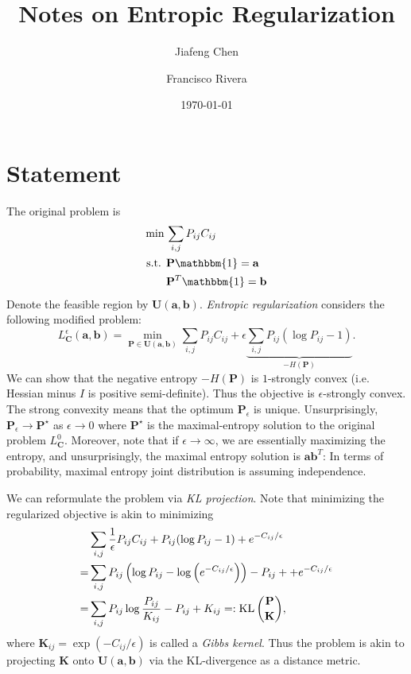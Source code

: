 \documentclass[11pt,reqno]{amsart}
\title{Notes on Entropic Regularization}
\author{Jiafeng Chen\and Francisco Rivera}
\date{\today}
\renewcommand{\b}{\mathbf}
\newcommand{\one}{\mathbbm{1}}
\newcommand{\KL}{\operatorname{KL}}
\theoremstyle{definition}
\theoremstyle{remark}
\begin{document}
\maketitle

\section{Statement}

The original problem is \begin{align*}
\min \,& \sum_{i,j} P_{ij} C_{ij}\\
\text{s.t. }&\b P\one = \b a \\
&\b P^T \one = \b b
\end{align*}
\newcommand{\feasible}{\b U(\b a, \b b)}
Denote the feasible region by $\feasible$. \emph{Entropic regularization}
 considers the following modified problem: \[
L^\epsilon_{\b C}(\b a ,\b b) = \min_{\b P \in \feasible} \sum_{i,j} P_{ij}C_
{ij} + \epsilon \underbrace{\sum_
{i,j} P_{ij}
(\log P_{ij} - 1)}_{-H(\b P)}.
\]
We can show that the negative entropy $-H(\b P)$ is $1$-strongly convex (i.e.
 Hessian minus $I$ is
 positive semi-definite). Thus the objective is $\epsilon$-strongly convex. The
 strong convexity means that the optimum $\b P_\epsilon$ is unique.
 Unsurprisingly, $\b P_\epsilon \to \b P^\star$ as $\epsilon \to 0$ where $\b
 P^\star$ is the maximal-entropy solution to the original problem $L_{\b C}^0$.
 Moreover, note that if $\epsilon \to \infty$, we are essentially maximizing the
 entropy, and unsurprisingly, the maximal entropy solution is $\b a \b b^T$:
 In terms of probability, maximal entropy joint distribution is assuming
 independence.

We can reformulate the problem via \emph{KL projection}. Note that minimizing
 the regularized objective is akin to minimizing \begin{align*}
 &\sum_{i,j}\frac{1}{\epsilon}P_{ij}C_{ij} + P_{ij}(\log P_{ij} - 1) + e^{-C_
{ij}/\epsilon} \\
=& \sum_{i,j} P_{ij} \pr{\log P_{ij} - \log\pr{e^{-C_{ij}/\epsilon}}} - P_{ij} +
+ e^{-C_
{ij}/\epsilon} \\
=& \sum_{i,j}P_{ij} \log\frac{P_{ij}}{K_{ij}} - P_{ij} + K_{ij} =: \KL
\binom{\b P}{\b K},
 \end{align*}
where $\b K_{ij} = \exp(-C_{ij}/\epsilon)$ is called a \emph{Gibbs kernel}. Thus
 the problem is akin to projecting $\b K$ onto $\feasible$ via the KL-divergence
 as a distance metric. 
\end{document}
